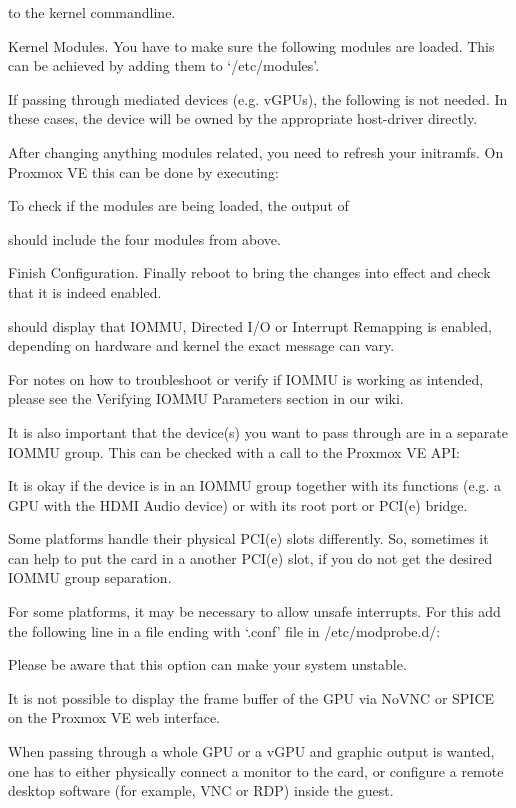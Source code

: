 to the kernel commandline.

Kernel Modules. You have to make sure the following modules are loaded. This can be achieved by adding them to ‘/etc/modules’.

If passing through mediated devices (e.g. vGPUs), the following is not needed. In these cases, the device will be owned by the appropriate host-driver directly.

After changing anything modules related, you need to refresh your initramfs. On Proxmox VE this can be done by executing:

To check if the modules are being loaded, the output of

should include the four modules from above.

Finish Configuration. Finally reboot to bring the changes into effect and check that it is indeed enabled.

should display that IOMMU, Directed I/O or Interrupt Remapping is enabled, depending on hardware and kernel the exact message can vary.

For notes on how to troubleshoot or verify if IOMMU is working as intended, please see the Verifying IOMMU Parameters section in our wiki.

It is also important that the device(s) you want to pass through are in a separate IOMMU group. This can be checked with a call to the Proxmox VE API:

It is okay if the device is in an IOMMU group together with its functions (e.g. a GPU with the HDMI Audio device) or with its root port or PCI(e) bridge.

Some platforms handle their physical PCI(e) slots differently. So, sometimes it can help to put the card in a another PCI(e) slot, if you do not get the desired IOMMU group separation.

For some platforms, it may be necessary to allow unsafe interrupts. For this add the following line in a file ending with ‘.conf’ file in /etc/modprobe.d/:

Please be aware that this option can make your system unstable.

It is not possible to display the frame buffer of the GPU via NoVNC or SPICE on the Proxmox VE web interface.

When passing through a whole GPU or a vGPU and graphic output is wanted, one has to either physically connect a monitor to the card, or configure a remote desktop software (for example, VNC or RDP) inside the guest.

